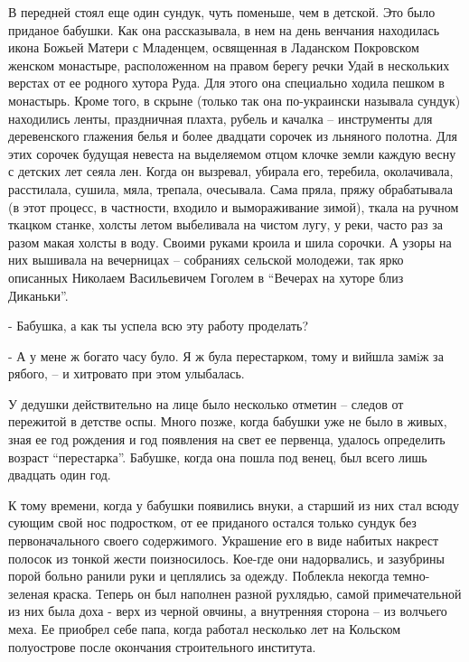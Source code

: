 В передней стоял еще один сундук, чуть поменьше, чем в детской. Это было
приданое бабушки. Как она рассказывала, в нем на день венчания находилась икона
Божьей Матери с Младенцем, освященная  в Ладанском Покровском женском
монастыре, расположенном на правом берегу речки Удай в нескольких верстах от ее
родного хутора Руда. Для этого она специально ходила пешком в монастырь. Кроме
того, в скрыне (только так она по-украински называла сундук) находились ленты,
праздничная плахта, рубель и качалка – инструменты для деревенского глажения
белья  и более двадцати сорочек из льняного полотна. Для этих сорочек будущая
невеста на выделяемом отцом клочке земли каждую весну с детских лет сеяла лен.
Когда он вызревал, убирала его, теребила, околачивала, расстилала, сушила,
мяла, трепала, очесывала. Сама пряла, пряжу обрабатывала (в этот процесс, в
частности, входило и вымораживание зимой), ткала на ручном ткацком станке,
холсты летом выбеливала на чистом лугу, у реки, часто раз за разом макая холсты
в воду. Своими руками кроила и шила сорочки. А узоры на них вышивала на
вечерницах – собраниях сельской молодежи, так ярко описанных Николаем
Васильевичем Гоголем в \enquote{Вечерах на хуторе близ Диканьки}.

- Бабушка, а как ты успела всю эту работу проделать?

- А у мене ж богато часу було. Я ж була перестарком, тому и вийшла замiж за
рябого, – и хитровато при этом улыбалась.

У дедушки действительно на лице было несколько отметин – следов от пережитой в
детстве оспы. Много позже, когда бабушки уже не было в живых, зная ее год
рождения и год появления на свет ее первенца, удалось определить возраст
\enquote{перестарка}. Бабушке, когда она пошла под венец, был всего лишь двадцать один
год.

К тому времени, когда у бабушки появились внуки, а старший из них стал всюду
сующим свой нос подростком, от ее приданого остался только сундук без
первоначального своего содержимого. Украшение его в виде набитых накрест
полосок из тонкой жести поизносилось. Кое-где они надорвались, и зазубрины
порой больно ранили руки и цеплялись за одежду. Поблекла некогда темно-зеленая
краска. Теперь он был наполнен разной рухлядью, самой примечательной из них
была доха - верх из черной овчины, а внутренняя сторона – из волчьего меха. Ее
приобрел себе папа, когда работал несколько лет на Кольском полуострове после
окончания строительного института.

